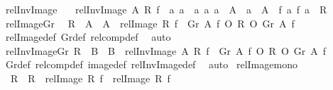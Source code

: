 \begin{isabellebody}
\isanewline
{}\isamarkupfalse%
\ relInvImage\ \isanewline
\ \ {\isachardoublequoteopen}relInvImage\ A\ R\ f\ {\isasymequiv}\ {\isacharbraceleft}{\kern0pt}{\isacharparenleft}{\kern0pt}a{}{\isacharcomma}{\kern0pt}\ a{}{\isacharparenright}{\kern0pt}\ {\isacharbar}{\kern0pt}\ a{}\ a{}{\isachardot}{\kern0pt}\ a{}\ {\isasymin}\ A\ {\isasymand}\ a{}\ {\isasymin}\ A\ {\isasymand}\ {\isacharparenleft}{\kern0pt}f\ a{}{\isacharcomma}{\kern0pt}\ f\ a{}{\isacharparenright}{\kern0pt}\ {\isasymin}\ R{\isacharbraceright}{\kern0pt}{\isachardoublequoteclose}\isanewline
\isanewline
{}\isamarkupfalse%
\ relImage{\isacharunderscore}{\kern0pt}Gr{\isacharcolon}{\kern0pt}\isanewline
\ \ {\isachardoublequoteopen}{\isasymlbrakk}R\ {\isasymsubseteq}\ A\ {\isasymtimes}\ A{\isasymrbrakk}\ {\isasymLongrightarrow}\ relImage\ R\ f\ {\isacharequal}{\kern0pt}\ {\isacharparenleft}{\kern0pt}Gr\ A\ f{\isacharparenright}{\kern0pt}{\isasyminverse}\ O\ R\ O\ Gr\ A\ f{\isachardoublequoteclose}\isanewline
%
\isadelimproof
\ \ %
\endisadelimproof
%
\isatagproof
{}\isamarkupfalse%
\ relImage{\isacharunderscore}{\kern0pt}def\ Gr{\isacharunderscore}{\kern0pt}def\ relcomp{\isacharunderscore}{\kern0pt}def\ \isamarkupfalse%
\ auto%
\endisatagproof
{\isafoldproof}%
%
\isadelimproof
\isanewline
%
\endisadelimproof
\isanewline
{}\isamarkupfalse%
\ relInvImage{\isacharunderscore}{\kern0pt}Gr{\isacharcolon}{\kern0pt}\ {\isachardoublequoteopen}{\isasymlbrakk}R\ {\isasymsubseteq}\ B\ {\isasymtimes}\ B{\isasymrbrakk}\ {\isasymLongrightarrow}\ relInvImage\ A\ R\ f\ {\isacharequal}{\kern0pt}\ Gr\ A\ f\ O\ R\ O\ {\isacharparenleft}{\kern0pt}Gr\ A\ f{\isacharparenright}{\kern0pt}{\isasyminverse}{\isachardoublequoteclose}\isanewline
%
\isadelimproof
\ \ %
\endisadelimproof
%
\isatagproof
{}\isamarkupfalse%
\ Gr{\isacharunderscore}{\kern0pt}def\ relcomp{\isacharunderscore}{\kern0pt}def\ image{\isacharunderscore}{\kern0pt}def\ relInvImage{\isacharunderscore}{\kern0pt}def\ \isamarkupfalse%
\ auto%
\endisatagproof
{\isafoldproof}%
%
\isadelimproof
\isanewline
%
\endisadelimproof
\isanewline
{}\isamarkupfalse%
\ relImage{\isacharunderscore}{\kern0pt}mono{\isacharcolon}{\kern0pt}\isanewline
\ \ {\isachardoublequoteopen}R{}\ {\isasymsubseteq}\ R{}\ {\isasymLongrightarrow}\ relImage\ R{}\ f\ {\isasymsubseteq}\ relImage\ R{}\ f{\isachardoublequoteclose}\isanewline

\end{isabellebody}
